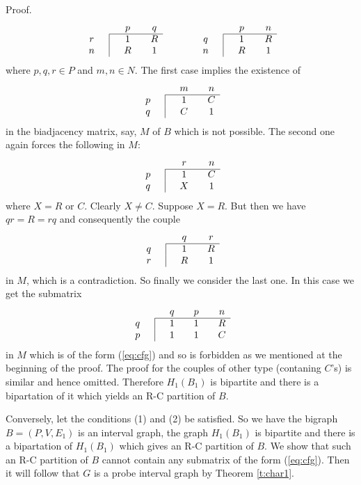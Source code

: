 \documentclass[secthm]{elsart}
\begin{document}
\begin{pf*}{Proof.}
$$\begin{array}{cc|cccc}
\multicolumn{3}{c}{} & p && q \\ \cline{3-6}
r &&& 1 && R \\
n &&& R && 1 
\end{array}\hspace{0.5in}
\begin{array}{cc|cccc}
\multicolumn{3}{c}{} & p && n \\ \cline{3-6}
q &&& 1 && R \\
n &&& R && 1 
\end{array}$$
where $p,q,r\in P$ and $m,n\in N$. The first case implies the existence of
$$\begin{array}{cc|cccc}
\multicolumn{3}{c}{} & m && n \\ \cline{3-6}
p &&& 1 && C \\
q &&& C && 1 
\end{array}$$
in the biadjacency matrix, say, $M$ of $B$ which is not possible. The second one again forces the following in $M$:
$$\begin{array}{cc|cccc}
\multicolumn{3}{c}{} & r && n \\ \cline{3-6}
p &&& 1 && C \\
q &&& X && 1 
\end{array}$$
where $X=R$ or $C$. Clearly $X\neq C$. Suppose $X=R$. But then we have $qr=R=rq$ and consequently the couple 
$$\begin{array}{cc|cccc}
\multicolumn{3}{c}{} & q && r \\ \cline{3-6}
q &&& 1 && R \\
r &&& R && 1 
\end{array}$$
in $M$, which is a contradiction. So finally we consider the last one. In this case we get the submatrix
$$\begin{array}{cc|cccccc}
\multicolumn{3}{c}{} & q && p && n \\ \cline{3-8}
q &&& 1 && 1 && R \\
p &&& 1 && 1 && C 
\end{array}$$
in $M$ which is of the form (\ref{eq:cfg}) and so is forbidden as we mentioned at the beginning of the proof. The proof for the couples of other type (contaning $C$'s) is similar and hence omitted. Therefore $H_1(B_1)$ is bipartite and there is a bipartation of it which yields an R-C partition of $B$.

Conversely, let the conditions (1) and (2) be satisfied. So we have the bigraph $B=(P,V,E_1)$ is an interval graph, the graph $H_1(B_1)$ is bipartite and there is a bipartation of $H_1(B_1)$ which gives an R-C partition of $B$. We show that such an R-C partition of $B$ cannot contain any submatrix of the form (\ref{eq:cfg}). Then it will follow that $G$ is a probe interval graph by Theorem \ref{t:char1}. 


\end{pf*}
\end{document}
